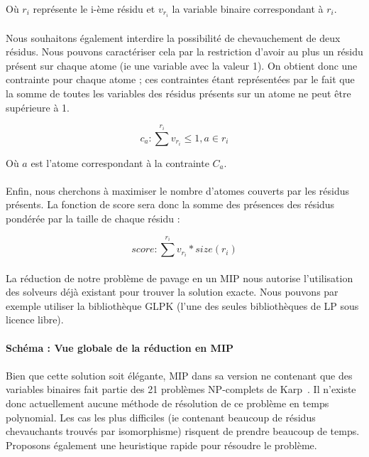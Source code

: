 \documentclass[12pt,french,twoside]{report}
\begin{document}
Où $r_i$ représente le i-ème résidu et $v_{r_i}$ la variable binaire correspondant à $r_i$.

\paragraph{}Nous souhaitons également interdire la possibilité de chevauchement de deux résidus. Nous pouvons caractériser cela
par la restriction d'avoir au plus un résidu présent sur chaque atome (ie une variable avec la valeur 1). On obtient donc une
contrainte pour chaque atome ; ces contraintes étant
représentées par le fait que la somme de toutes les variables des résidus présents sur un atome ne peut être supérieure à 1.

\begin{equation}
 c_a : \sum^{r_i} v_{r_i} \leqslant 1, a \in r_i
\end{equation}

Où $a$ est l'atome correspondant à la contrainte $C_a$.

\paragraph{}Enfin, nous cherchons à maximiser le nombre d'atomes couverts par les résidus présents. La fonction de score sera
donc la somme des présences des résidus pondérée par la taille de chaque résidu :

\begin{equation}
 score : \sum^{r_i} v_{r_i} * size(r_i)
\end{equation}

\paragraph{}La réduction de notre problème de pavage en un MIP nous autorise l'utilisation des solveurs déjà existant pour trouver la solution exacte.
Nous pouvons par exemple utiliser la bibliothèque GLPK (l'une des seules bibliothèques de LP sous licence libre).

\paragraph{Schéma : Vue globale de la réduction en MIP}

\paragraph{}Bien que cette solution soit élégante, MIP dans sa version ne contenant que des variables binaires fait partie des 21 problèmes NP-complets de Karp~\cite{karp_reducibility_1972}.
Il n'existe donc actuellement aucune méthode de résolution de ce problème en temps polynomial.
Les cas les plus difficiles (ie contenant beaucoup de résidus chevauchants trouvés par isomorphisme) risquent de prendre beaucoup de temps.
Proposons également une heuristique rapide pour résoudre le problème.
\end{document}
